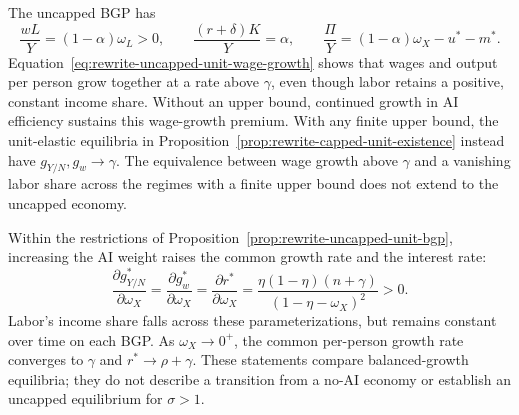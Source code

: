 The uncapped BGP has
\begin{equation}
 \frac{wL}{Y}=(1-\alpha)\omega_L>0,\qquad
 \frac{(r+\delta)K}{Y}=\alpha,\qquad
 \frac{\Pi}{Y}=(1-\alpha)\omega_X-u^*-m^*.
 \label{eq:rewrite-uncapped-unit-distribution}
\end{equation}
Equation~\eqref{eq:rewrite-uncapped-unit-wage-growth} shows that wages
and output per person grow together at a rate above $\gamma$, even though
labor retains a positive, constant income share. Without an upper bound,
continued growth in AI efficiency sustains this wage-growth premium.
With any finite upper bound, the unit-elastic equilibria in
Proposition~\ref{prop:rewrite-capped-unit-existence} instead have
$g_{Y/N},g_w\to\gamma$. The equivalence between wage growth above
$\gamma$ and a vanishing labor share across the regimes with a finite upper bound
does not extend to the uncapped economy.

Within the restrictions of Proposition~\ref{prop:rewrite-uncapped-unit-bgp},
increasing the AI weight raises the common growth rate and the interest rate:
\begin{equation}
 \frac{\partial g_{Y/N}^*}{\partial\omega_X}
 =\frac{\partial g_w^*}{\partial\omega_X}
 =\frac{\partial r^*}{\partial\omega_X}
 =\frac{\eta(1-\eta)(n+\gamma)}{(1-\eta-\omega_X)^2}>0.
 \label{eq:rewrite-uncapped-unit-comparative-statics}
\end{equation}
Labor's income share falls across these parameterizations, but remains
constant over time on each BGP. As $\omega_X\to0^+$, the common per-person
growth rate converges to $\gamma$ and $r^*\to\rho+\gamma$. These statements
compare balanced-growth equilibria; they do not describe a transition
from a no-AI economy or establish an uncapped equilibrium for $\sigma>1$.
